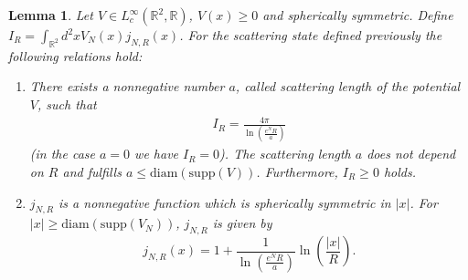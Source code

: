 \documentclass[11pt, english, american]{article}
\newtheorem{lemma}[theorem]{Lemma}
\begin{document}
\begin{lemma} \label{scattlemma fuer v}
Let $V \in L_c^\infty( \mathbb{R}^2, \mathbb{R})$, $V(x) \geq 0$ and spherically symmetric.
Define $I_{R} = \int_{\mathbb{R}^2} d^2x V_N(x) j_{N,R}(x)$.
For the scattering state defined previously the following relations hold:
\begin{enumerate}
\item[(a)] There exists a nonnegative number $a$, called scattering length of the potential $ V$, such that
\begin{align*}
I_{R}=
  \frac{4 \pi }{\ln \left(\frac{e^N R}{a}\right)}
\end{align*}
(in the case $a=0$ we have $I_R=0$).
The scattering length $a$ does not depend on $R$ and fulfills $a \leq \text{diam}(\text{supp}(V))$.
Furthermore, $I_R \geq 0$ holds.
\item[(b)]
$j_{N,R}$ is a nonnegative function which is spherically symmetric in $|x|$. For $|x| \geq \text{diam}(\text{supp}(V_N))$, $j_{N,R}$ is given by
 $$
 j_{N,R} (x)
= 1 +  \frac{1}{\ln \left(\frac{e^N R}{a}\right)} \ln \left( \frac{|x|}{R} \right). $$
\end{enumerate}


\end{lemma}
\end{document}
